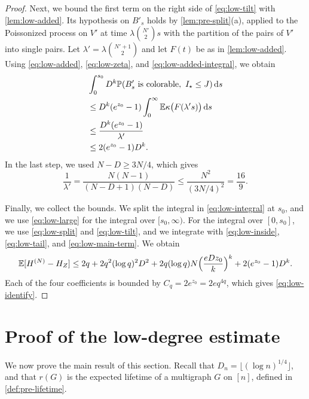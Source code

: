 \begin{proof}
Next, we bound the first term on the right side of \eqref{eq:low-tilt} with \cref{lem:low-added}. Its hypothesis on $B'_s$ holds by \cref{lem:pre-split}(a), applied to the Poissonized process on $V'$ at time $\lambda \binom{N'}{2} s$ with the partition of the pairs of $V'$ into single pairs. Let $\lambda' = \lambda \binom{N' + 1}{2}$ and let $F(t)$ be as in \cref{lem:low-added}. Using \eqref{eq:low-added}, \eqref{eq:low-zeta}, and \eqref{eq:low-added-integral}, we obtain
\begin{equation}\label{eq:low-main-term}
\begin{aligned}
&\int_0^{s_0} D^k \mathbb P(B'_s \text{ is colorable}, \ I_\star \le J) \,\mathrm d s \\
&\le D^k (e^{z_0} - 1) \int_0^\infty \mathbb E \kappa\bigl(F(\lambda' s)\bigr) \,\mathrm d s \\
&\le \frac{D^k (e^{z_0} - 1)}{\lambda'} \\
&\le 2 (e^{z_0} - 1) D^k.
\end{aligned}
\end{equation}
In the last step, we used $N - D \ge 3N/4$, which gives
\begin{equation*}
\frac{1}{\lambda'} = \frac{N(N - 1)}{(N - D + 1)(N - D)} \le \frac{N^2}{(3N/4)^2} = \frac{16}{9}.
\end{equation*}

Finally, we collect the bounds. We split the integral in \eqref{eq:low-integral} at $s_0$, and we use \eqref{eq:low-large} for the integral over $[s_0, \infty)$. For the integral over $[0, s_0]$, we use \eqref{eq:low-split} and \eqref{eq:low-tilt}, and we integrate with \eqref{eq:low-inside}, \eqref{eq:low-tail}, and \eqref{eq:low-main-term}. We obtain
\begin{equation*}
\mathbb E[H^{(N)} - H_Z] \le 2q + 2q^2 (\log q)^2 D^2 + 2q (\log q) N \Bigl(\frac{e D z_0}{k}\Bigr)^k + 2 (e^{z_0} - 1) D^k.
\end{equation*}
Each of the four coefficients is bounded by $C_q = 2 e^{z_0} = 2e q^{4q}$, which gives \eqref{eq:low-identify}.
\end{proof}

\section{Proof of the low-degree estimate}\label{sec:low-main}

We now prove the main result of this section. Recall that $D_n = \lfloor (\log n)^{1/4} \rfloor$, and that $r(G)$ is the expected lifetime of a multigraph $G$ on $[n]$, defined in \cref{def:pre-lifetime}.

